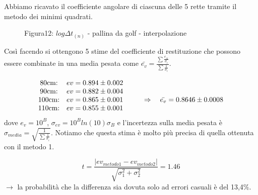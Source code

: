 \documentclass[a4paper]{article}
\theoremstyle{definition}
\begin{document}
	\noindent Abbiamo ricavato il coefficiente angolare di ciascuna delle 5 rette tramite il metodo dei minimi quadrati.
	
	\begin{figure}[!ht]
		\captionsetup{labelformat=empty}
		\caption{ Figura12: \(log\Delta t _{(n)}\) - pallina da golf - interpolazione}
	\end{figure}
	
	\noindent Così facendo si ottengono 5 stime del coefficiente di restituzione che possono essere combinate in una media pesata come \(\bar{e_{v}} = \frac{\sum\frac{e_{vi}}{\sigma_{i}}}{\sum\frac{1}{\sigma _{i}}}\).
	
	\[\begin{matrix}
		$80cm:$ & $\(ev = 0.894 \pm 0.002\)$ &  \\ 
		$90cm:$ & $\(ev = 0.882 \pm 0.004\)$ &  \\ 
		$100cm:$ & $\(ev = 0.865 \pm 0.001\)$ & $\(\qquad \Rightarrow \quad \bar{e_{v}} = 0.8646 \pm 0.0008\)$\\ 
		$110cm:$ & $\(ev = 0.855 \pm 0.001\)$ &  
	\end{matrix}\]
	dove \(e_{v}= 10^{B}\), \(\sigma_{ev} = 10^{B}ln(10)\sigma_{B}\) e l'incertezza sulla media pesata è \(\sigma _{media}=\sqrt{\frac{1}{\sum \frac{1}{\sigma _{i}}}}\). Notiamo che questa stima è molto più precisa di quella ottenuta con il metodo 1.
	
	\[t = \frac{ \left |ev_{metodo1}  - ev_{metodo2} \right |}{\sqrt{\sigma_{1}^{2}+ \sigma_{2}^{2}}} =  1.46 \]
\noindent \(\rightarrow\) la probabilità che la differenza sia dovuta solo ad errori casuali è del 13,4\(\%\).
\end{document}

